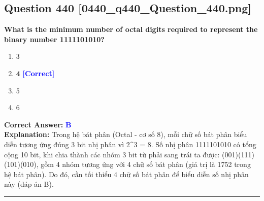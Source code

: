 \documentclass[11pt,a4paper]{article}
\begin{document}
\begin{minipage}{\textwidth}
\subsection*{Question 440 \quad \footnotesize{[0440\_q440\_Question\_440.png]}}
\noindent \textbf{What is the minimum number of octal digits required to represent the binary number 1111101010?}

\begin{enumerate}[label=\Alph*.]
    \item 3
    \item \textbf{4} \hfill \textcolor{blue}{\textbf{[Correct]}}
    \item 5
    \item 6
\end{enumerate}

\noindent \textbf{Correct Answer:} \textcolor{blue}{\textbf{B}} \\[2pt]
\noindent \textbf{Explanation:} Trong hệ bát phân (Octal - cơ số 8), mỗi chữ số bát phân biểu diễn tương ứng đúng 3 bit nhị phân vì 2\textasciicircum{}3 = 8. Số nhị phân 1111101010 có tổng cộng 10 bit, khi chia thành các nhóm 3 bit từ phải sang trái ta được: (001)(111)(101)(010), gồm 4 nhóm tương ứng với 4 chữ số bát phân (giá trị là 1752 trong hệ bát phân). Do đó, cần tối thiểu 4 chữ số bát phân để biểu diễn số nhị phân này (đáp án B).

\par\vspace{0.3cm}
\hrule
\vspace{0.3cm}
\end{minipage}
\end{document}
